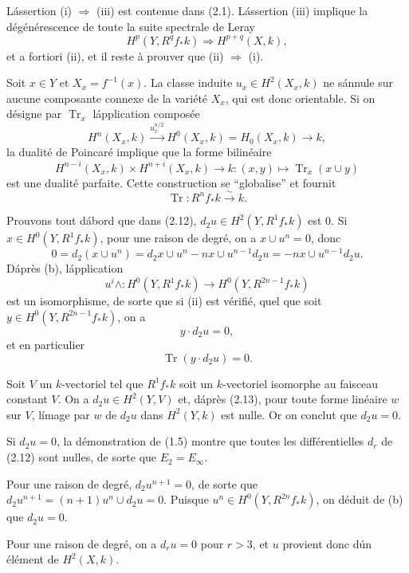 \documentclass[12pt]{amsart}
\theoremstyle{plain}
\theoremstyle{remark}
\DeclareMathOperator{\Tr}{Tr}
\begin{document}
L\'assertion (i) $\Rightarrow$ (iii) est contenue dans (2.1). L\'assertion (iii) implique la d\'eg\'en\'erescence de toute la suite spectrale de Leray
\begin{equation}\label{eq:2.12}
H^p(Y, R^qf_*k) \Rightarrow H^{p+q}(X, k),
\end{equation}
et a fortiori (ii), et il reste \`a prouver que (ii) $\Rightarrow$ (i).

Soit $x \in Y$ et $X_x = f^{-1}(x)$. La classe induite $u_x \in H^2(X_x, k)$ ne s\'annule sur aucune composante connexe de la vari\'et\'e $X_x$, qui est donc orientable. Si on d\'esigne par $\Tr_x$ l\'application compos\'ee
\[
H^n(X_x, k) \xrightarrow{u_x^{n/2}} H^0(X_x, k) = H_0(X_x, k) \longrightarrow k,
\]
la dualit\'e de Poincar\'e implique que la forme bilin\'eaire
\[
H^{n-i}(X_x, k) \times H^{n+i}(X_x, k) \longrightarrow k : (x, y) \mapsto \Tr_x(x \cup y)
\]
est une dualit\'e parfaite. Cette construction se ``globalise'' et fournit
\[
\Tr : R^nf_*k \xrightarrow{\sim} k.
\]

Prouvons tout d\'abord que dans (2.12), $d_2u \in H^2(Y, R^1f_*k)$ est $0$. Si $x \in H^0(Y, R^1f_*k)$, pour une raison de degr\'e, on a $x \cup u^n = 0$, donc
\[
0 = d_2(x \cup u^n) = d_2x \cup u^n - n x \cup u^{n-1} d_2u = -n x \cup u^{n-1} d_2u.
\]
D\'apr\`es (b), l\'application
\[
u^i \wedge : H^0(Y, R^1f_*k) \longrightarrow H^0(Y, R^{2n-1}f_*k)
\]
est un isomorphisme, de sorte que si (ii) est v\'erifi\'e, quel que soit $y \in H^0(Y, R^{2n-1}f_*k)$, on a
\[
y \cdot d_2u = 0,
\]
et en particulier
\begin{equation}\label{eq:2.13}
\Tr(y \cdot d_2u) = 0.
\end{equation}

Soit $V$ un $k$-vectoriel tel que $R^1f_*k$ soit un $k$-vectoriel isomorphe au faisceau constant $V$. On a $d_2u \in H^2(Y, V)$ et, d\'apr\`es (2.13), pour toute forme lin\'eaire $w$ sur $V$, l\'image par $w$ de $d_2u$ dans $H^2(Y, k)$ est nulle. Or on conclut que $d_2u = 0$.

Si $d_2u = 0$, la d\'emonstration de (1.5) montre que toutes les diff\'erentielles $d_r$ de (2.12) sont nulles, de sorte que $E_2 = E_\infty$.

Pour une raison de degr\'e, $d_2u^{n+1} = 0$, de sorte que $d_2u^{n+1} = (n+1) u^n \cup d_2u = 0$. Puisque $u^n \in H^0(Y, R^{2n}f_*k)$, on d\'eduit de (b) que $d_2u = 0$.

Pour une raison de degr\'e, on a $d_ru = 0$ pour $r > 3$, et $u$ provient donc d\'un \'el\'ement de $H^2(X, k)$.
\end{document}
